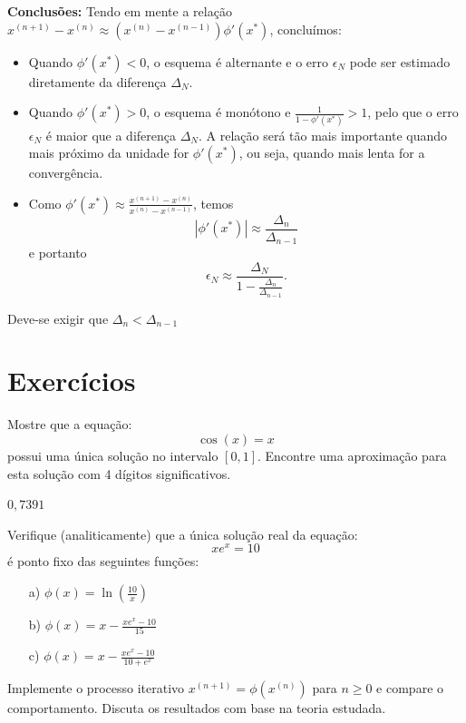{\bf Conclusões:} Tendo em mente a relação $x^{(n+1)}-x^{(n)}  \approx (x^{(n)}-x^{(n-1)}) \phi'(x^*)$, concluímos:
\begin{itemize}
\item Quando $\phi'(x^*)<0$, o esquema é alternante e o erro $\epsilon_N$ pode ser estimado diretamente da diferença $\Delta_N$.
\item Quando $\phi'(x^*)>0$, o esquema é monótono e $\frac{1}{1-\phi'(x^*)}>1$, pelo que o erro $\epsilon_N$ é maior que a diferença $\Delta_N$. A relação será tão mais importante quando mais próximo da unidade for $\phi'(x^*)$, ou seja, quando mais lenta for a convergência.
\item Como $\phi'(x^*)\approx \frac{x^{(n+1)}-x^{(n)}}{x^{(n)}-x^{(n-1)}}$, temos
$$\left|\phi'(x^*)\right|\approx \frac{\Delta_n}{\Delta_{n-1}}$$
e portanto
$$\epsilon_N \approx \frac{\Delta_N}{1-\frac{\Delta_n}{\Delta_{n-1}}}.$$
\end{itemize}

\begin{obs}
  Deve-se exigir que $\Delta_n<\Delta_{n-1}$
\end{obs}

\section*{Exercícios}

\begin{Exercise}  Mostre que a equação:
  \begin{equation*}
    \cos(x)=x  
  \end{equation*}
possui uma única solução no intervalo $[0, 1]$. Encontre uma aproximação para esta solução com  4 dígitos significativos.
\end{Exercise}
\begin{Answer}
  \begin{tiny}
    $0,7391$
  \end{tiny}
\end{Answer}

\begin{Exercise} Verifique (analiticamente) que a única solução real da equação:
  \begin{equation*}
    xe^x=10
  \end{equation*}
é ponto fixo das seguintes funções:
\begin{itemize}
\item[a)] $\phi(x)=\ln\left(\frac{10}{x}\right)$
\item[b)] $\phi(x)=x-\frac{xe^{x}-10}{15}$
\item[c)] $\phi(x)=x-\frac{xe^{x}-10}{10+e^{x}}$
\end{itemize}
Implemente o processo iterativo $x^{(n+1)}=\phi(x^{(n)})$ para $n\geq 0$ e compare o comportamento. Discuta os resultados com base na teoria estudada.
\end{Exercise}

